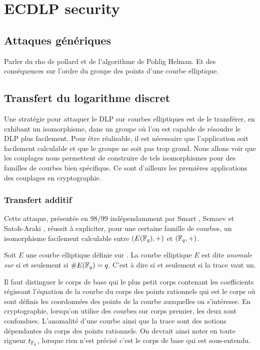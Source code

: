 \chapter{ECDLP security}
\section{Attaques génériques}
Parler du rho de pollard et de l'algorithme de Pohlig Helman. Et des conséquences sur l'ordre du groupe des points d'une courbe elliptique.

\section{Transfert du logarithme discret}
Une stratégie pour attaquer le DLP sur courbes elliptiques est de le transférer, en exhibant un isomorphisme, dans un groupe où l'on est capable de résoudre le DLP plus facilement. Pour être réalisable, il est nécessaire que l'application soit facilement calculable et que le groupe ne soit pas trop grand. Nous allons voir que les couplages nous permettent de construire de tels isomorphismes pour des familles de courbes bien spécifique. Ce sont d'ailleurs les premières applications des couplages en cryptographie.


\subsection{Transfert additif}
Cette attaque, présentée en 98/99 indépendamment par Smart \cite{smart1999discrete}, Semaev et Satoh-Araki \cite{satoh1998fermat}, réussit à expliciter, pour une certaine famille de courbes, un isomorphisme facilement calculable entre $(E(\mathbb{F}_{q}), +)$ et $(\mathbb{F}_{q}, +)$. 

\begin{definition}
Soit $E$ une courbe elliptique définie sur . La courbe elliptique $E$ est dite \emph{anomale sur } si et seulement si $\# E(\mathbb{F}_{q}) = q$. C'est à dire si et seulement si la trace vaut un.
\end{definition}

Il faut distinguer le corps de base qui le plus petit corps contenant les coefficients régissant l'équation de la courbe du corps des points rationnels qui est le corps où sont définis les coordonnées des points de la courbe auxquelles on s'intéresse. En cryptographie, lorsqu'on utilise des courbes sur corps premier, les deux sont confondues. L'anomalité d'une courbe ainsi que la trace sont des notions dépendantes du corps des points rationnels. On devrait ainsi noter en toute rigueur $t_{\mathbb{F}_{q}}$, lorsque rien n'est précisé c'est le corps de base qui est sous-entendu.

